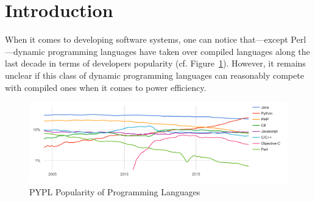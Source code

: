
\section{Introduction}


When it comes to developing software systems, one can notice that---except Perl---dynamic programming languages have taken over compiled languages along the last decade in terms of developers popularity (cf. Figure~\ref{fig:pypl}).
However, it remains unclear if this class of dynamic programming languages can reasonably compete with compiled ones when it comes to power efficiency.

\begin{figure}[htbp]
    \includegraphics[width=\linewidth]{imgs/programminglanguangespopularity.png}
    \caption{PYPL Popularity of Programming Languages~\cite{noauthor_pypl_nodate}}
    \label{fig:pypl}
\end{figure}

